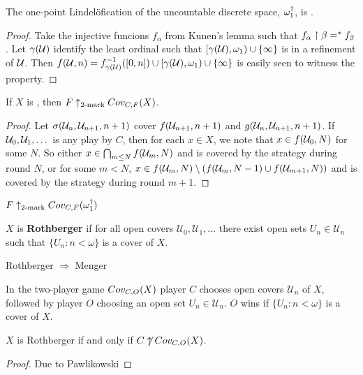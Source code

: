   \begin{theorem}
    The one-point Lindel\"ofication of the uncountable discrete space, $\omega_1^\dagger$, is \scish.
  \end{theorem}

  \begin{proof}
    Take the injective funcions $f_\alpha$ from Kunen's lemma such that $f_\alpha\restriction\beta =^* f_\beta$. Let $\gamma(\mathcal{U})$ identify the least ordinal such that $[\gamma(\mathcal{U}),\omega_1)\cup\{\infty\}$ is in a refinement of $\mathcal{U}$. Then $f(\mathcal{U},n)=f^{-1}_{\gamma(\mathcal{U})}([0,n]) \cup [\gamma(\mathcal{U}),\omega_1)\cup\{\infty\}$ is easily seen to witness the property.
  \end{proof}

  \begin{theorem}
    If $X$ is \scish, then $F \uparrow_{2\text{-mark}}Cov_{C,F}(X)$.
  \end{theorem}

  \begin{proof}
    Let $\sigma(\mathcal{U}_n,\mathcal{U}_{n+1},n+1)$ cover $f(\mathcal{U}_{n+1},n+1)$ and $g(\mathcal{U}_n,\mathcal{U}_{n+1},n+1)$. If $\mathcal{U}_0,\mathcal{U}_1,\dots$ is any play by $C$, then for each $x\in X$, we note that $x\in f(\mathcal{U}_0,N)$ for some $N$. So either $x\in \bigcap_{m\leq N} f(\mathcal{U}_m,N)$ and is covered by the strategy during round $N$, or for some $m< N$, $x \in f(\mathcal{U}_m,N)\setminus (f(\mathcal{U}_{m},N-1)\cup f(\mathcal{U}_{m+1},N))$ and is covered by the strategy during round $m+1$.
  \end{proof}

  \begin{corollary}
    $F\uparrow_{2\text{-mark}}Cov_{C,F}(\omega_1^\dagger)$
  \end{corollary}

  \newpage

  \begin{definition}
    $X$ is \textbf{Rothberger} if for all open covers $\mathcal{U}_0,\mathcal{U}_1,\dots$ there exist open sets $U_n\in \mathcal{U}_n$ such that $\{U_n:n<\omega\}$ is a cover of $X$.
  \end{definition}

  \begin{proposition}
    Rothberger $\Rightarrow$ Menger
  \end{proposition}

  \begin{definition}
    In the two-player game $Cov_{C,O}(X)$ player $C$ chooses open covers $\mathcal{U}_n$ of $X$, followed by player $O$ choosing an open set $U_n\in\mathcal{U}_n$. $O$ wins if $\{U_n:n<\omega\}$ is a cover of $X$.
  \end{definition}

  \begin{theorem}
    $X$ is Rothberger if and only if $C\not\uparrow Cov_{C,O}(X)$.
  \end{theorem}

  \begin{proof}
    Due to Pawlikowski
  \end{proof}




